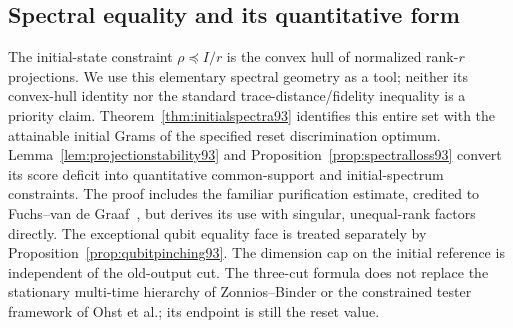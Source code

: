 \subsection{Spectral equality and its quantitative form}
The initial-state constraint $\rho\preceq I/r$ is the convex hull of
normalized rank-$r$ projections.  We use this elementary spectral
geometry as a tool; neither its convex-hull identity nor the standard
trace-distance/fidelity inequality is a priority claim.
Theorem~\ref{thm:initialspectra93} identifies this entire set with the
attainable initial Grams of the specified reset discrimination optimum.
Lemma~\ref{lem:projectionstability93} and
Proposition~\ref{prop:spectralloss93} convert its score deficit into
quantitative common-support and initial-spectrum constraints.
The proof includes the familiar purification estimate, credited to
Fuchs--van de Graaf~\cite{FvdG93}, but derives its use with singular,
unequal-rank factors directly.  The exceptional qubit equality face
is treated separately by Proposition~\ref{prop:qubitpinching93}.
The dimension cap on the initial reference is independent of the
old-output cut.  The three-cut formula does not replace the stationary
multi-time hierarchy of Zonnios--Binder or the constrained tester
framework of Ohst et al.; its endpoint is still the reset value.
